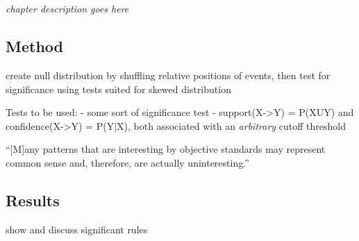 
\chapter{\significance}
\label{ch:significance}
\emph{chapter description goes here}

\section{Method}
create null distribution by shuffling relative positions of events, then test for significance using tests suited for skewed distribution

Tests to be used:
- some sort of significance test
- support(X->Y) = P(XUY) and confidence(X->Y) = P(Y|X), both associated with an \emph{arbitrary} cutoff threshold \citep[]{han12}

``[M]any patterns that are interesting by objective standards may represent common sense and, therefore, are actually uninteresting.'' \citep[]{han12}
\section{Results}
show and discuss significant rules